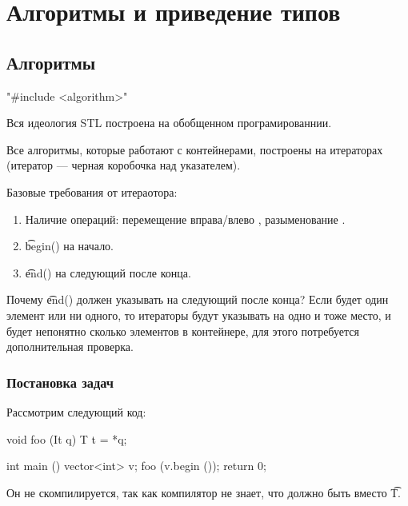 
\chapter{Алгоритмы и приведение типов}
\section{Алгоритмы}

\cpp"#include <algorithm>"

Вся идеология STL построена на обобщенном програмированнии. 

Все алгоритмы, которые работают с контейнерами, построены на итераторах (итератор --- черная коробочка над указателем).

Базовые требования от итераотора:
\begin{enumerate}
	\item Наличие операций: перемещение вправа/влево \cpp{--, ++}, разыменование \cpp{*->, *}. 
	\item \t{begin()} на начало.
	\item \t{end()} на следующий после конца.
\end{enumerate}

Почему \t{end()} должен указывать на следующий после конца? 
Если будет один элемент или ни одного, то итераторы будут указывать на одно и тоже место, и будет непонятно сколько элементов в контейнере, для этого потребуется дополнительная проверка. 

\subsection{Постановка задач}

Рассмотрим следующий код:
\begin{cppcode}
void foo (It q){
	T t = *q;
}

int main () {
	vector<int> v;
	foo (v.begin ());
	return 0; 
}
\end{cppcode}
Он не скомпилируется, так как компилятор не знает, что должно быть вместо \t{T}.

















